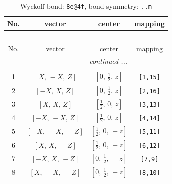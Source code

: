 \documentclass[fleqn,8pt]{jsarticle}
\begin{document}
\begin{longtable}{cccc}
\caption{Wyckoff bond: {\tt 8e@4f}, bond symmetry: {\tt ..m}}
 \\
 \hline \hline
No. & vector & center & mapping \\ \hline \endfirsthead

\multicolumn{3}{l}{\tablename\ \thetable{}} \\
 \hline \hline
No. & vector & center & mapping \\ \hline \endhead

 \hline \hline
\multicolumn{3}{r}{\footnotesize\it continued ...} \\ \endfoot

 \hline \hline
\multicolumn{3}{r}{} \\ \endlastfoot

1 & $\left[ X,\, - X,\, Z \right]$ & $\left[ 0,\, \frac{1}{2},\, z \right]$ & {\tt [1,15]} \\ \hline
2 & $\left[ - X,\, X,\, Z \right]$ & $\left[ 0,\, \frac{1}{2},\, z \right]$ & {\tt [2,16]} \\ \hline
3 & $\left[ X,\, X,\, Z \right]$ & $\left[ \frac{1}{2},\, 0,\, z \right]$ & {\tt [3,13]} \\ \hline
4 & $\left[ - X,\, - X,\, Z \right]$ & $\left[ \frac{1}{2},\, 0,\, z \right]$ & {\tt [4,14]} \\ \hline
5 & $\left[ - X,\, - X,\, - Z \right]$ & $\left[ \frac{1}{2},\, 0,\, - z \right]$ & {\tt [5,11]} \\ \hline
6 & $\left[ X,\, X,\, - Z \right]$ & $\left[ \frac{1}{2},\, 0,\, - z \right]$ & {\tt [6,12]} \\ \hline
7 & $\left[ - X,\, X,\, - Z \right]$ & $\left[ 0,\, \frac{1}{2},\, - z \right]$ & {\tt [7,9]} \\ \hline
8 & $\left[ X,\, - X,\, - Z \right]$ & $\left[ 0,\, \frac{1}{2},\, - z \right]$ & {\tt [8,10]} \\
\end{longtable}
\renewcommand{\arraystretch}{1.2}
\end{document}

